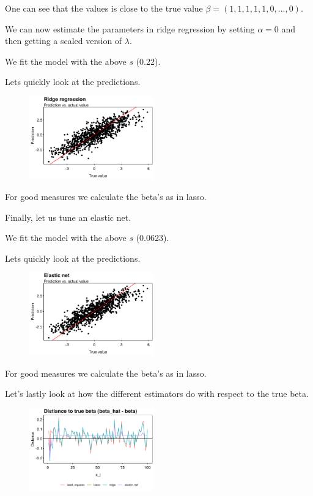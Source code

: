 \documentclass[a4paper,12pt,openany]{book}
\begin{document}
One can see that the values is close to the true value \(\beta=(1,1,1,1,1,0,...,0)\).

We can now estimate the parameters in ridge regression by setting \(\alpha = 0\) and then getting a scaled version of \(\lambda\).

We fit the model with the above \(s\) (0.22).

Lets quickly look at the predictions.

\begin{figure}[H]
  \begin{center}
    \includegraphics[width=0.48\textwidth]{figures/ML_week2_ex1_03.png}
  \end{center}
\end{figure}

For good measures we calculate the beta's as in lasso.

Finally, let us tune an elastic net.

We fit the model with the above \(s\) (0.0623).

Lets quickly look at the predictions.

\begin{figure}[H]
  \begin{center}
    \includegraphics[width=0.48\textwidth]{figures/ML_week2_ex1_04.png}
  \end{center}
\end{figure}

For good measures we calculate the beta's as in lasso.

Let's lastly look at how the different estimators do with respect to the true beta.

\begin{figure}[H]
  \begin{center}
    \includegraphics[width=0.48\textwidth]{figures/ML_week2_ex1_05.png}
  \end{center}
\end{figure}
\end{document}
